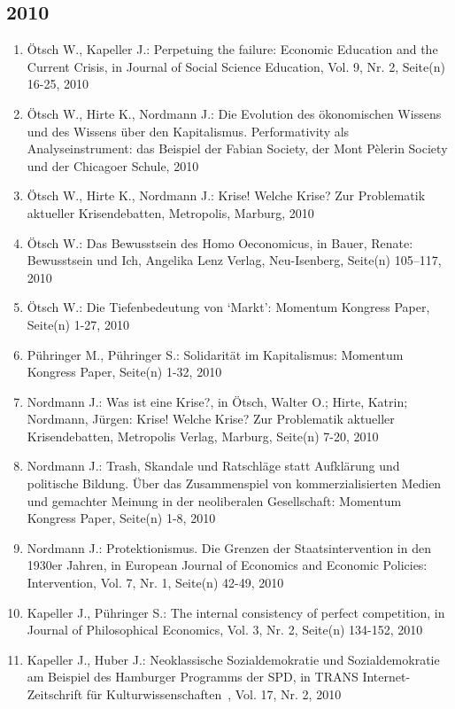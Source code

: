 \subsection*{2010}
\begin{enumerate}
    	 \item Ötsch W., Kapeller J.: Perpetuing the failure: Economic Education and the Current Crisis, in Journal of Social Science Education, Vol. 9, Nr. 2, Seite(n) 16-25, 2010
	 \item Ötsch W., Hirte K., Nordmann J.: Die Evolution des ökonomischen Wissens und des Wissens über den Kapitalismus. Performativity als Analyseinstrument: das Beispiel der Fabian Society, der Mont Pèlerin Society und der Chicagoer Schule, 2010
	 \item Ötsch W., Hirte K., Nordmann J.: Krise! Welche Krise? Zur Problematik aktueller Krisendebatten, Metropolis, Marburg, 2010
	 \item Ötsch W.: Das Bewusstsein des Homo Oeconomicus, in Bauer, Renate: Bewusstsein und Ich, Angelika Lenz Verlag, Neu-Isenberg, Seite(n) 105–117, 2010
	 \item Ötsch W.: Die Tiefenbedeutung von ‘Markt’: Momentum Kongress Paper, Seite(n) 1-27, 2010
	 \item Pühringer M., Pühringer S.: Solidarität im Kapitalismus: Momentum Kongress Paper, Seite(n) 1-32, 2010
	 \item Nordmann J.: Was ist eine Krise?, in Ötsch, Walter O.; Hirte, Katrin; Nordmann, Jürgen: Krise! Welche Krise? Zur Problematik aktueller Krisendebatten, Metropolis Verlag, Marburg, Seite(n) 7-20, 2010
	 \item Nordmann J.: Trash, Skandale und Ratschläge statt Aufklärung und politische Bildung. Über das Zusammenspiel von kommerzialisierten Medien und gemachter Meinung in der neoliberalen Gesellschaft: Momentum Kongress Paper, Seite(n) 1-8, 2010
	 \item Nordmann J.: Protektionismus. Die Grenzen der Staatsintervention in den 1930er Jahren, in European Journal of Economics and Economic Policies: Intervention, Vol. 7, Nr. 1, Seite(n) 42-49, 2010
	 \item Kapeller J., Pühringer S.: The internal consistency of perfect competition, in Journal of Philosophical Economics, Vol. 3, Nr. 2, Seite(n) 134-152, 2010
	 \item Kapeller J., Huber J.: Neoklassische Sozialdemokratie und Sozialdemokratie am Beispiel des Hamburger Programms der SPD, in TRANS Internet-Zeitschrift für Kulturwissenschaften , Vol. 17, Nr. 2, 2010

\end{enumerate}

